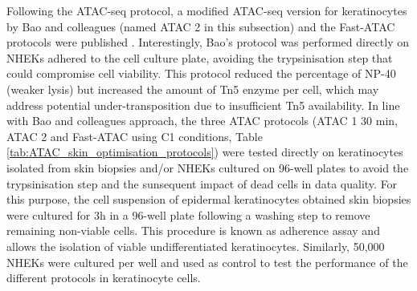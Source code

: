 Following the ATAC-seq protocol, a modified ATAC-seq version for keratinocytes by Bao and colleagues (named ATAC 2 in this subsection) and the Fast-ATAC protocols were published \parencite{Bao2015, Corces2016}. Interestingly, Bao's protocol was performed directly on NHEKs adhered to the cell culture plate, avoiding the trypsinisation step that could compromise cell viability. This protocol reduced the percentage of NP-40 (weaker lysis) but increased the amount of Tn5 enzyme per cell, which may address potential under-transposition due to insufficient Tn5 availability. In line with Bao and colleagues approach, the three ATAC protocols (ATAC 1 30 min, ATAC 2 and Fast-ATAC using C1 conditions, Table \ref{tab:ATAC_skin_optimisation_protocols}) were tested directly on keratinocytes isolated from skin biopsies and/or NHEKs cultured on 96-well plates to avoid the trypsinisation step and the sunsequent impact of dead cells in data quality. For this purpose, the cell suspension of epidermal keratinocytes obtained skin biopsies were cultured for 3h in a 96-well plate following a washing step to remove remaining non-viable cells. This procedure is known as adherence assay and allows the isolation of viable undifferentiated keratinocytes. Similarly, 50,000 NHEKs were cultured per well and used as control to test the performance of the different protocols in keratinocyte cells. 


